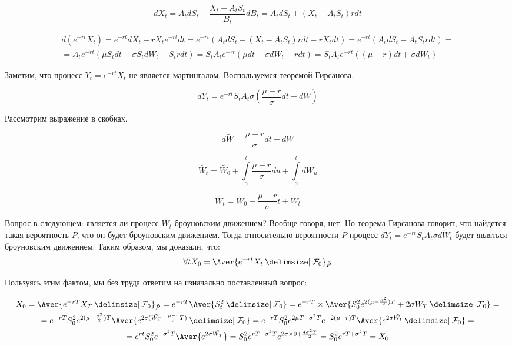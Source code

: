 \documentclass[a4paper]{article}
\providecommand\given{}
\renewcommand\given{  \nonscript\:
  \delimsize\vert
  \nonscript\:
  \mathopen{}
  \allowbreak}
\begin{document}
\[
dX_t = A_t d S_t + \frac{X_t-A_t S_t}{B_t} dB_t = A_t d S_t + (X_t - A_t S_t)rdt \]

\begin{multline*}
d(e^{-rt}X_t) = e^{-rt} d X_t - rX_t e^{-rt}dt = e^{-rt}(A_t d S_t +(X_t - A_t S_t)rdt - rX_tdt) = e^{-rt} (A_t d S_t - A_t S_t rdt) = \\ = A_t e^{-rt} (\mu S_t dt + \sigma S_t d W_t - S_t r dt) = S_t A_t e^{-rt} (\mu dt + \sigma d W_t - rdt) = S_t A_t e^{-rt} ((\mu - r) dt + \sigma d W_t)
\end{multline*}


  Заметим, что процесс $Y_t = e^{-rt}X_t$ не является мартингалом. Воспользуемся теоремой Гирсанова.

  \[
dY_t = e^{-rt} S_t A_t \sigma (\frac{\mu -r}{\sigma} dt + dW) \]


  Рассмотрим выражение в скобках.

  \[
d \tilde{W} = \frac{\mu-r}{\sigma}dt + dW \]

  \[
\tilde{W_t} = \tilde{W_0} + \int\limits_{0}^{t}\frac{\mu-r}{\sigma}du + \int\limits_{0}^{t}dW_u\]

  \[ \tilde{W_t} = \tilde{W_0} + \frac{\mu-r}{\sigma}t + W_t
 \]

 Вопрос в следующем: является ли процесс $\tilde{W_t}$ броуновским движением? Вообще говоря, нет. Но теорема Гирсанова говорит, что найдется такая вероятность $\tilde{P}$, что он будет броуновским движением. Тогда относительно вероятности $\tilde{P}$ процесс $dY_t = e^{-rt} S_t A_t \sigma d \tilde {W_t}$ будет являться броуновским движением. Таким образом, мы доказали, что:
  \begin{equation*}
  \forall t X_0 = \Aver{e^{-rt} X_t \given \mathcal{F}_0}_{\tilde{P}}
  \end{equation*}

  Пользуясь этим фактом, мы без труда ответим на изначально поставленный вопрос:

  \begin{multline*}
X_0 = \Aver{e^{-rT} X_T \given \mathcal{F}_0}_{\tilde{P}} = e^{-rT} \Aver{S^2_{t} \given \mathcal{F}_0} = e^{-rT} \times \Aver{S^2_0 e^{2(\mu - \frac{\sigma^2}{2})T}+2\sigma W_T \given \mathcal{F}_0} = \\ = e^{-rT} S^2_0 e^{2(\mu - \frac{\sigma^2}{2})T} \Aver{e^{2\sigma(\tilde{W_T}-\frac{\mu-r}{\sigma}T)}\given \mathcal{F}_0} = e^{-rT} S^2_0 e^{2\mu T - \sigma^2 T} e^{-2(\mu - r)T} \Aver{e^{2 \sigma \tilde{W_t}} \given \mathcal{F}_0} = \\ = e^{rt} S^2_0 e^{- \sigma^2 T} \Aver{e^{2 \sigma \tilde{W_T}}} = S^2_0 e^{rT-\sigma^2T} e^{2\sigma \times 0 + \frac{4\sigma^2 T}{2}} =  S^2_0e^{rT+\sigma^2T} = X_0 
\end{multline*}
\end{document}
